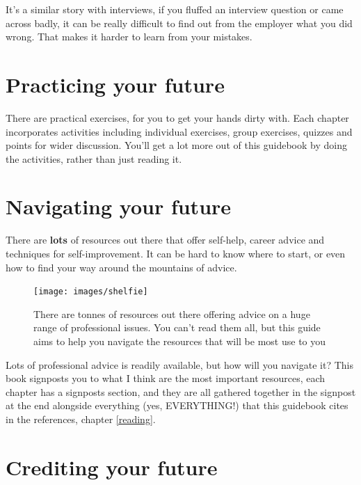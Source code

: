 \documentclass[
]{book}
\begin{document}
It's a similar story with interviews, if you fluffed an interview question or came across badly, it can be really difficult to find out from the employer what you did wrong. That makes it harder to learn from your mistakes.

\hypertarget{activities}{%
\section{Practicing your future}\label{activities}}

There are practical exercises, for you to get your hands dirty with. Each chapter incorporates activities including individual exercises, group exercises, quizzes and points for wider discussion. You'll get a lot more out of this guidebook by doing the activities, rather than just reading it.

\hypertarget{relatedwork}{%
\section{Navigating your future}\label{relatedwork}}

There are \textbf{lots} of resources out there that offer self-help, career advice and techniques for self-improvement. It can be hard to know where to start, or even how to find your way around the mountains of advice.

\begin{figure}

{\centering \texttt{[image: images/shelfie]} 

}

\caption{There are tonnes of resources out there offering advice on a huge range of professional issues. You can't read them all, but this guide aims to help you navigate the resources that will be most use to you}\label{fig:shelfie-fig}
\end{figure}



Lots of professional advice is readily available, but how will you navigate it? This book signposts you to what I think are the most important resources, each chapter has a signposts section, and they are all gathered together in the signpost at the end alongside everything (yes, EVERYTHING!) that this guidebook cites in the references, chapter \ref{reading}.

\hypertarget{crediting}{%
\section{Crediting your future}\label{crediting}}
\end{document}

